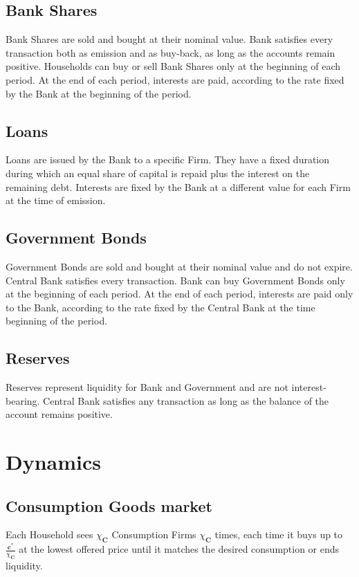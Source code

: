 \documentclass[a4paper, headings=standardclasses]{scrartcl}
\begin{document}
\subsection{Bank Shares}
Bank Shares are sold and bought at their nominal value. Bank satisfies every transaction both as emission and as buy-back, as long as the accounts remain positive. Households can buy or sell Bank Shares only at the beginning of each period. At the end of each period, interests are paid, according to the rate fixed by the Bank at the beginning of the period.

\subsection{Loans}
Loans are issued by the Bank to a specific Firm. They have a fixed duration during which an equal share of capital is repaid plus the interest on the remaining debt. Interests are fixed by the Bank at a different value for each Firm at the time of emission.

\subsection{Government Bonds}
Government Bonds are sold and bought at their nominal value and do not expire. Central Bank satisfies every transaction. Bank can buy Government Bonds only at the beginning of each period. At the end of each period, interests are paid only to the Bank, according to the rate fixed by the Central Bank at the time beginning of the period.

\subsection{Reserves}
Reserves represent liquidity for Bank and Government and are not interest-bearing. Central Bank satisfies any transaction as long as the balance of the account remains positive.

\section{Dynamics}
\subsection{Consumption Goods market}
Each Household sees $\chi_\mathbf{C}$ Consumption Firms $\chi_\mathbf{C}$ times, each time it buys up to $\frac{\mathbf{c}^*}{\chi_\mathbf{C}}$ at the lowest offered price until it matches the desired consumption or ends liquidity.
\end{document}
